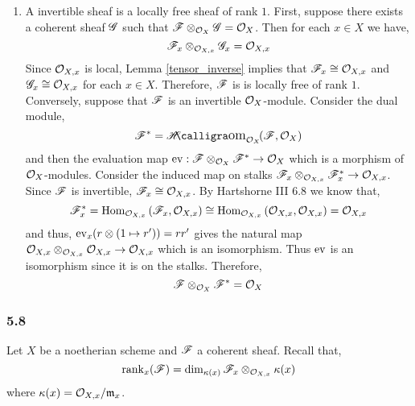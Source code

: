 \documentclass[12pt]{article}
\begin{document}
\begin{enumerate}
\item A invertible sheaf is a locally free sheaf of rank $1$. First, suppose there exists a coherent sheaf $\mathscr{G}$ such that $\mathscr{F} \otimes_{\mathcal{O}_{X}} \mathscr{G} = \mathcal{O}_{X}$. Then for each $x \in X$ we have,
\[ \mathscr{F}_x \otimes_{\mathcal{O}_{X, x}} \mathscr{G}_x = \mathcal{O}_{X, x} \]
Since $\mathcal{O}_{X, x}$ is local, Lemma \ref{tensor_inverse} implies that $\mathscr{F}_x \cong \mathcal{O}_{X, x}$ and $\mathscr{G}_x \cong \mathcal{O}_{X, x}$ for each $x \in X$. Therefore, $\mathscr{F}$ is is locally free of rank $1$.
\bigskip\\
Conversely, suppose that $\mathscr{F}$ is an invertible $\mathcal{O}_{X}$-module. Consider the dual module,
\[ \F^* = \shHom{\struct{X}}{\F}{\struct{X}} \]
and then the evaluation map $\mathrm{ev} : \mathscr{F} \otimes_{\mathcal{O}_{X}} \mathscr{F}^* \to \mathcal{O}_{X}$ which is a morphism of $\mathcal{O}_{X}$-modules.
Consider the induced map on stalks $\mathscr{F}_x \otimes_{\mathcal{O}_{X, x}} \mathscr{F}^*_x \to \mathcal{O}_{X, x}$. Since $\mathscr{F}$ is invertible, $\mathscr{F}_x \cong \mathcal{O}_{X, x}$. By Hartshorne III 6.8 we know that,
\[ \mathscr{F}^*_x = \mathrm{Hom}_{\mathcal{O}_{X, x}} \left( \mathscr{F}_x, \mathcal{O}_{X, x} \right) \cong \mathrm{Hom}_{\mathcal{O}_{X, x}} \left( \mathcal{O}_{X, x}, \mathcal{O}_{X, x} \right) = \mathcal{O}_{X, x} \] and thus, $\mathrm{ev}_x(r \otimes (1 \mapsto r')) = rr'$ gives the natural map $\mathcal{O}_{X, x} \otimes_{\mathcal{O}_{X, x}} \mathcal{O}_{X, x} \to \mathcal{O}_{X, x}$ which is an isomorphism. Thus $\mathrm{ev}$ is an isomorphism since it is on the stalks. Therefore, 
\[ \mathscr{F} \otimes_{\mathcal{O}_{X}} \mathscr{F}^* = \mathcal{O}_{X} \]
\end{enumerate}


\subsubsection{5.8}

Let $X$ be a noetherian scheme and $\mathscr{F}$ a coherent sheaf. Recall that,
\[ \mathrm{rank}_{x}(\mathscr{F}) = \dim_{\kappa(x)} \mathscr{F}_x \otimes_{\mathcal{O}_{X, x}} \kappa(x) \]
where $\kappa(x) = \mathcal{O}_{X, x} / \mathfrak{m}_x$. 
\end{document}
